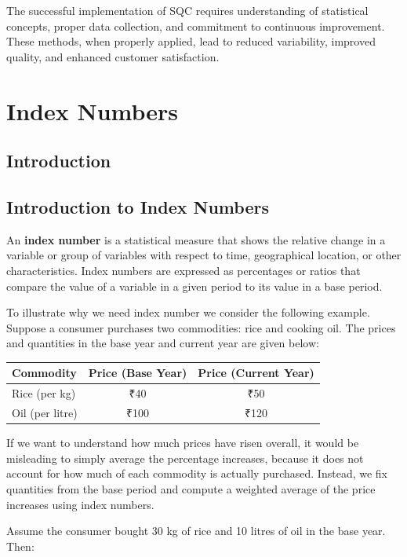 \documentclass[twoside]{book}
\begin{document}
The successful implementation of SQC requires understanding of statistical concepts, proper data collection, and commitment to continuous improvement. These methods, when properly applied, lead to reduced variability, improved quality, and enhanced customer satisfaction.


\chapter{Index Numbers}

\section{Introduction}

\section{Introduction to Index Numbers}

An \textbf{index number} is a statistical measure that shows the relative change in a variable or group of variables with respect to time, geographical location, or other characteristics. Index numbers are expressed as percentages or ratios that compare the value of a variable in a given period to its value in a base period.

To illustrate why we need index number we consider the following example. Suppose a consumer purchases two commodities: rice and cooking oil. The prices and quantities in the base year and current year are given below:

\begin{table}[H]
\centering
\begin{tabular}{l|c|c}
\toprule
\textbf{Commodity} & \textbf{Price (Base Year)} & \textbf{Price (Current Year)} \\
\midrule
Rice (per kg) & ₹40 & ₹50 \\
Oil (per litre) & ₹100 & ₹120 \\
\bottomrule
\end{tabular}
\end{table}

If we want to understand how much prices have risen overall, it would be misleading to simply average the percentage increases, because it does not account for how much of each commodity is actually purchased. Instead, we fix quantities from the base period and compute a weighted average of the price increases using index numbers.

Assume the consumer bought 30 kg of rice and 10 litres of oil in the base year. Then:
\end{document}
